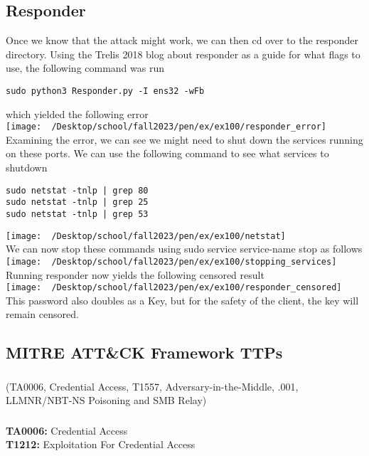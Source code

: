 \documentclass[notitlepage]{article}
\begin{document}
    \subsection{Responder}
    Once we know that the attack might work, we can then cd over to the responder directory. Using
    the Trelis 2018 blog about responder as a guide for what flags to use, the following command was
    run
\begin{verbatim}
sudo python3 Responder.py -I ens32 -wFb
\end{verbatim}
    which yielded the following error\\
\texttt{[image: ~/Desktop/school/fall2023/pen/ex/ex100/responder\_error]}\\
    Examining the error, we can see we might need to shut down the services running on these ports.
    We can use the following command to see what services to shutdown
\begin{verbatim}
sudo netstat -tnlp | grep 80
sudo netstat -tnlp | grep 25
sudo netstat -tnlp | grep 53
\end{verbatim}
\texttt{[image: ~/Desktop/school/fall2023/pen/ex/ex100/netstat]}\\
    We can now stop these commands using sudo service service-name stop as follows \\
\texttt{[image: ~/Desktop/school/fall2023/pen/ex/ex100/stopping\_services]}\\
    Running responder now yields the following censored result \\
\texttt{[image: ~/Desktop/school/fall2023/pen/ex/ex100/responder\_censored]}\\
    This password also doubles as a Key, but for the safety of the client, the key will remain
    censored.

    \subsection{MITRE ATT{\&}CK Framework TTPs}
    
    \subsubsection*{}
    \ttp(TA0006, Credential Access, T1557, Adversary-in-the-Middle, .001, LLMNR/NBT-NS Poisoning and SMB Relay) \\

	\subsubsection*{}
	\indent\textbf{TA0006:} Credential Access \\
   \indent\indent\textbf{T1212:} Exploitation For Credential Access \\
    
\end{document}
